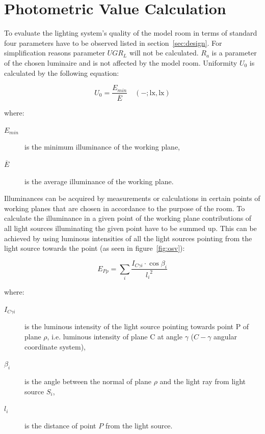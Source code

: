 \section{Photometric Value Calculation}
To evaluate the lighting system's quality of the model room in terms of standard \cite{12464} four parameters have to be observed listed in section~\ref{sec:design}. For simplification reasons parameter $UGR_{L}$ will not be calculated. $R_{a}$ is a parameter of the chosen luminaire and is not affected by the model room. Uniformity $U_{0}$ is calculated by the following equation:

\begin{equation}
U_{0}=\frac{E_{min}}{\overline{E}} \quad \mathrm{(-;lx,lx)}
\end{equation}

where:
\begin{description}
	\item[$E_{min}$] is the minimum illuminance of the working plane,
	\item[$\overline{E}$] is the average illuminance of the working plane.
\end{description}

Illuminances can be acquired by measurements or calculations in certain points of working planes that are chosen in accordance to the purpose of the room. To calculate the illuminance in a given point of the working plane contributions of all light sources illuminating the given point have to be summed up. This can be achieved by using luminous intensities of all the light sources pointing from the light source towards the point (as seen in figure~\ref{fig:osv}):

\begin{equation}
E_{P\rho}=\sum_{i} \frac{I_{C \gamma i} \cdot \cos{\beta_{i}}}{{l_{i}}^{2}}
\end{equation}

where:
\begin{description}
	\item[$I_{C \gamma i}$] is the luminous intensity of the light source pointing towards point P of plane $\rho$, i.e. luminous intensity of plane C at angle $\gamma$ ($C-\gamma$ angular coordinate system),
	\item[$\beta_{i}$] is the angle between the normal of plane $\rho$ and the light ray from light source $S_{i}$,
	\item[$l_{i}$] is the distance of point $P$ from the light source.
\end{description}

